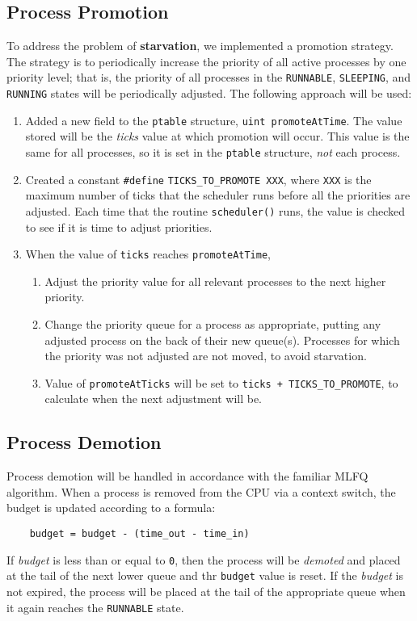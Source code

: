 \documentclass[11pt,letterpaper]{report}
\begin{document}
	\subsection{Process Promotion}
	To address the problem of \textbf{starvation}, we implemented a promotion strategy. The strategy is to periodically increase the priority of all active processes by one priority level; that is, the priority of all processes in the {\tt RUNNABLE}, {\tt SLEEPING}, and {\tt RUNNING} states will be periodically adjusted.
	The following approach will be used:
	\begin{enumerate}
		\item Added a new field to the {\tt ptable} structure, {\tt uint promoteAtTime}. The value stored will be the \emph{ticks} value at which promotion will occur. This value is the same for all processes, so it is set in the {\tt ptable} structure, \emph{not} each process.
		
		\item Created a constant {\tt \#define} {\tt TICKS\_TO\_PROMOTE XXX}, where {\tt XXX} is the maximum number of ticks that the scheduler runs before all the priorities are adjusted. Each time that the routine {\tt scheduler()} runs, the value is checked to see if it is time to adjust priorities.
		
		\item When the value of {\tt ticks} reaches {\tt promoteAtTime},
		\begin{enumerate}
			\item Adjust the priority value for all relevant processes to the next higher priority.
			\item Change the priority queue for a process as appropriate, putting any adjusted process on the back of their new queue(s). Processes for which the priority was not adjusted are not moved, to avoid starvation.
			\item Value of {\tt promoteAtTicks} will be set to {\tt ticks + TICKS\_TO\_PROMOTE}, to calculate when the next adjustment will be.
		\end{enumerate} 
	\end{enumerate}
	
	\subsection{Process Demotion}
	Process demotion will be handled in accordance with the familiar MLFQ algorithm. When a process is removed from the CPU via a context switch, the budget is updated according to a formula:
	\begin{verbatim}
	budget = budget - (time_out - time_in)
	\end{verbatim}
	If \emph{budget} is less than or equal to {\tt 0}, then the process will be \emph{demoted} and placed at the tail of the next lower queue and thr {\tt budget} value is reset. If the \emph{budget} is not expired, the process will be placed at the tail of the appropriate queue when it again reaches the {\tt RUNNABLE} state.
	
\end{document}

